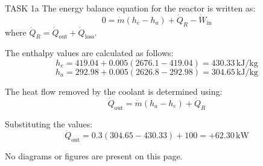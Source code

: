 TASK 1a  
The energy balance equation for the reactor is written as:  
\[
0 = \dot{m} \left( h_e - h_a \right) + \dot{Q}_R - \dot{W}_{\text{in}}
\]  
where \( \dot{Q}_R = \dot{Q}_{\text{out}} + \dot{Q}_{\text{loss}} \).  

The enthalpy values are calculated as follows:  
\[
h_e = 419.04 + 0.005 \left( 2676.1 - 419.04 \right) = 430.33 \, \text{kJ/kg}
\]  
\[
h_a = 292.98 + 0.005 \left( 2626.8 - 292.98 \right) = 304.65 \, \text{kJ/kg}
\]  

The heat flow removed by the coolant is determined using:  
\[
\dot{Q}_{\text{out}} = \dot{m} \left( h_a - h_e \right) + \dot{Q}_R
\]  

Substituting the values:  
\[
\dot{Q}_{\text{out}} = 0.3 \left( 304.65 - 430.33 \right) + 100 = +62.30 \, \text{kW}
\]  

No diagrams or figures are present on this page.